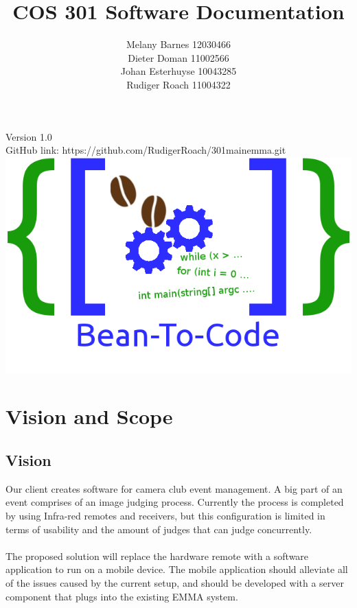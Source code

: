\documentclass[10pt,a4paper]{article}
\title{COS 301 Software Documentation}
\author{Melany Barnes 12030466 \\
		Dieter Doman 11002566 \\
		Johan Esterhuyse 10043285 \\
		Rudiger Roach 11004322 }
\date{}
\begin{document}
\maketitle
\begin{center}
Version 1.0 \\
GitHub link: https://github.com/RudigerRoach/301\textunderscore main\textunderscore emma.git \\
\vspace*{5\baselineskip}
\includegraphics[scale=0.35]{Pictures/Logo.png}
\end{center}
\pagebreak
\tableofcontents
\pagebreak
\section{Vision and Scope}

\subsection{Vision}
Our client creates software for camera club event management. A big part of an event comprises of an image judging process. Currently the process is completed by using Infra-red remotes and receivers, but this configuration is limited in terms of usability and the amount of judges that can judge concurrently.\\\\
The proposed solution will replace the hardware remote with a software application to run on a mobile device. The mobile application should alleviate all of the issues caused by the current setup, and should be developed with a server component that plugs into the existing EMMA system.  
\end{document}
